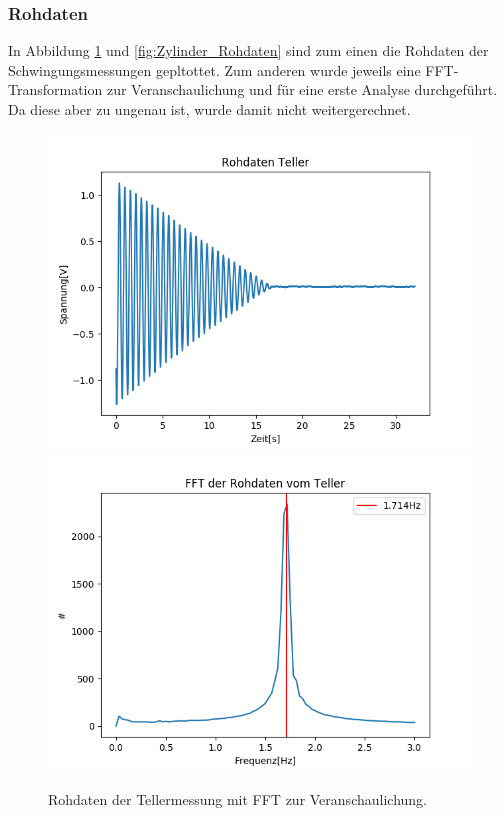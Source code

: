 \documentclass[12pt,a4paper]{article}
\begin{document}
\subsubsection{Rohdaten}
In Abbildung \ref{fig:Teller_Rohdaten} und \ref{fig:Zylinder_Rohdaten} sind zum einen die Rohdaten der Schwingungsmessungen gepltottet. Zum anderen wurde jeweils eine FFT-Transformation zur Veranschaulichung und für eine erste Analyse durchgeführt. Da diese aber zu ungenau ist, wurde damit nicht weitergerechnet.
\begin{figure}
\includegraphics[width=0.49\linewidth]{Bilder/Teller_Rohdaten.PNG}
\includegraphics[width=0.49\linewidth]{Bilder/Teller_FFT.PNG}
\caption{Rohdaten der Tellermessung mit FFT zur Veranschaulichung.}
\label{fig:Teller_Rohdaten}
\end{figure}
\end{document}
